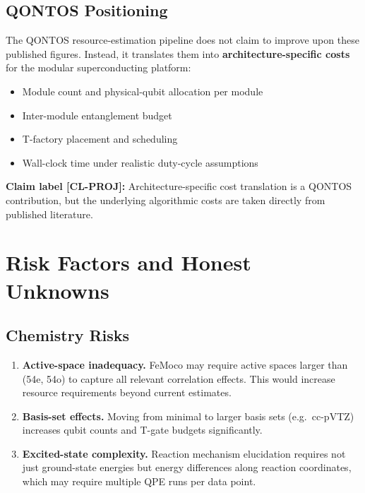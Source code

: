 \documentclass[conference]{IEEEtran}
\begin{document}
\subsection{QONTOS Positioning}

The QONTOS resource-estimation pipeline does not claim to improve upon these published
figures. Instead, it translates them into \textbf{architecture-specific costs} for the
modular superconducting platform:

\begin{itemize}[leftmargin=*]
\item Module count and physical-qubit allocation per module
\item Inter-module entanglement budget
\item T-factory placement and scheduling
\item Wall-clock time under realistic duty-cycle assumptions
\end{itemize}

\textbf{Claim label [CL-PROJ]:} Architecture-specific cost translation is a QONTOS
contribution, but the underlying algorithmic costs are taken directly from published
literature.

\section{Risk Factors and Honest Unknowns}

\subsection{Chemistry Risks}

\begin{enumerate}[leftmargin=*]
\item \textbf{Active-space inadequacy.} FeMoco may require active spaces larger than (54e, 54o)
   to capture all relevant correlation effects. This would increase resource
   requirements beyond current estimates.

\item \textbf{Basis-set effects.} Moving from minimal to larger basis sets (e.g.\ cc-pVTZ)
   increases qubit counts and T-gate budgets significantly.

\item \textbf{Excited-state complexity.} Reaction mechanism elucidation requires not just
   ground-state energies but energy differences along reaction coordinates, which
   may require multiple QPE runs per data point.
\end{enumerate}
\end{document}
